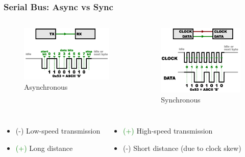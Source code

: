 \begin{frame}
  \frametitle{Serial Bus: Async vs Sync}
  \begin{columns}
      \begin{figure}
        \centering
        \includegraphics[scale=0.69]{images/serial-async.png}
        \caption{Asynchronous}
      \end{figure}
      \begin{figure}
        \centering
        \includegraphics[scale=0.69]{images/serial-sync.png}
        \caption{Synchronous}
      \end{figure}
  \end{columns}
  \begin{columns}
      \begin{itemize}
        \item[] \alert{(-)} Low-speed transmission
        \item[] \textcolor{green}{(+)} Long distance
      \end{itemize}
      \begin{itemize}
        \item[] \textcolor{green}{(+)} High-speed transmission
        \item[] \alert{(-)} Short distance (due to clock skew)
      \end{itemize}
  \end{columns}
\end{frame}

